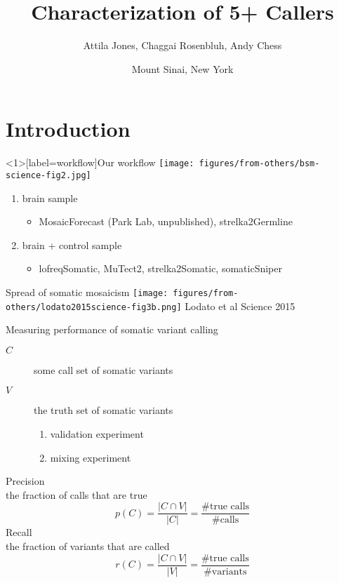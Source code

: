 \documentclass{beamer}
\title{Characterization of 5+ Callers}
\author{Attila Jones, Chaggai Rosenbluh, Andy Chess}
\date{Mount Sinai, New York}
\begin{document}
\maketitle

\section{Introduction}

\begin{frame}<1>[label=workflow]{Our workflow}
\texttt{[image: figures/from-others/bsm-science-fig2.jpg]}
\small
\begin{enumerate}
\item brain sample
\begin{itemize}
\item MosaicForecast (Park Lab, unpublished), strelka2Germline
\end{itemize}
\item<2> brain + control sample
\begin{itemize}
\item lofreqSomatic, MuTect2, strelka2Somatic, somaticSniper
\end{itemize}
\end{enumerate}
\end{frame}


\begin{frame}{Spread of somatic mosaicism}
\texttt{[image: figures/from-others/lodato2015science-fig3b.png]}
\vfill
\tiny{Lodato et al Science 2015}
\end{frame}


\begin{frame}[label=precrecall]{Measuring performance of somatic variant calling}
\begin{description}
\item [\(C\)] some call set of somatic variants
\item [\(V\)] the truth set of somatic variants
\begin{enumerate}
\item validation experiment
\item mixing experiment
\end{enumerate}
\end{description}
\vfill
\alert{Precision}\\
the fraction of calls that are true
\begin{equation}
p(C) = \frac{|C \cap V|}{|C|} = \frac{\#\text{true calls}}{\#\mathrm{calls}}
\end{equation}
\alert{Recall}\\
the fraction of variants that are called
\begin{equation}
r(C) = \frac{|C \cap V|}{|V|} = \frac{\#\text{true calls}}{\#\mathrm{variants}}
\end{equation}
\end{frame}
\end{document}

